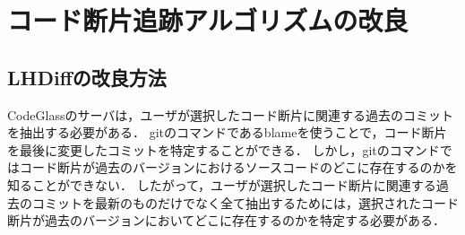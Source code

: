 

\section{コード断片追跡アルゴリズムの改良}

\label{section:Piece_level_Diff_Backtrack_Algorithm}

\subsection{LHDiffの改良方法}
CodeGlassのサーバは，ユーザが選択したコード断片に関連する過去のコミットを抽出する必要がある．
gitのコマンドであるblameを使うことで，コード断片を最後に変更したコミットを特定することができる．
しかし，gitのコマンドではコード断片が過去のバージョンにおけるソースコードのどこに存在するのかを知ることができない．
したがって，ユーザが選択したコード断片に関連する過去のコミットを最新のものだけでなく全て抽出するためには，選択されたコード断片が過去のバージョンにおいてどこに存在するのかを特定する必要がある．




